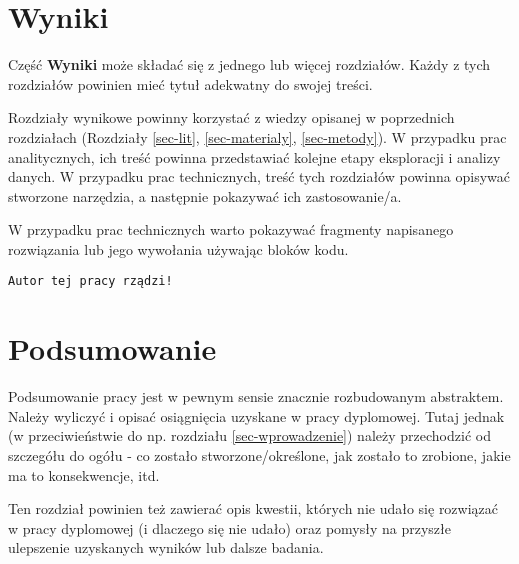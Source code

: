 \documentclass{amuthesis}
\begin{document}

\hypertarget{sec-wyniki}{%
\chapter{Wyniki}\label{sec-wyniki}}

Część \textbf{Wyniki} może składać się z jednego lub więcej rozdziałów.
Każdy z tych rozdziałów powinien mieć tytuł adekwatny do swojej treści.

Rozdziały wynikowe powinny korzystać z wiedzy opisanej w poprzednich
rozdziałach (Rozdziały \ref{sec-lit}, \ref{sec-materialy},
\ref{sec-metody}). W przypadku prac analitycznych, ich treść powinna
przedstawiać kolejne etapy eksploracji i analizy danych. W przypadku
prac technicznych, treść tych rozdziałów powinna opisywać stworzone
narzędzia, a następnie pokazywać ich zastosowanie/a.

W przypadku prac technicznych warto pokazywać fragmenty napisanego
rozwiązania lub jego wywołania używając bloków kodu.

\begin{Shaded}
\begin{Highlighting}[]
\OtherTok{=} 
  \NormalTok{)}
\NormalTok{\}}
\NormalTok{(}\NormalTok{)}
\end{Highlighting}
\end{Shaded}

\begin{verbatim}
Autor tej pracy rządzi!
\end{verbatim}


\hypertarget{podsumowanie}{%
\chapter{Podsumowanie}\label{podsumowanie}}

Podsumowanie pracy jest w pewnym sensie znacznie rozbudowanym
abstraktem. Należy wyliczyć i opisać osiągnięcia uzyskane w pracy
dyplomowej. Tutaj jednak (w przeciwieństwie do np. rozdziału
\ref{sec-wprowadzenie}) należy przechodzić od szczegółu do ogółu - co
zostało stworzone/określone, jak zostało to zrobione, jakie ma to
konsekwencje, itd.

Ten rozdział powinien też zawierać opis kwestii, których nie udało się
rozwiązać w pracy dyplomowej (i dlaczego się nie udało) oraz pomysły na
przyszłe ulepszenie uzyskanych wyników lub dalsze badania.

\printbibliography[heading=bibintoc, title=Bibliografia]
\end{document}
